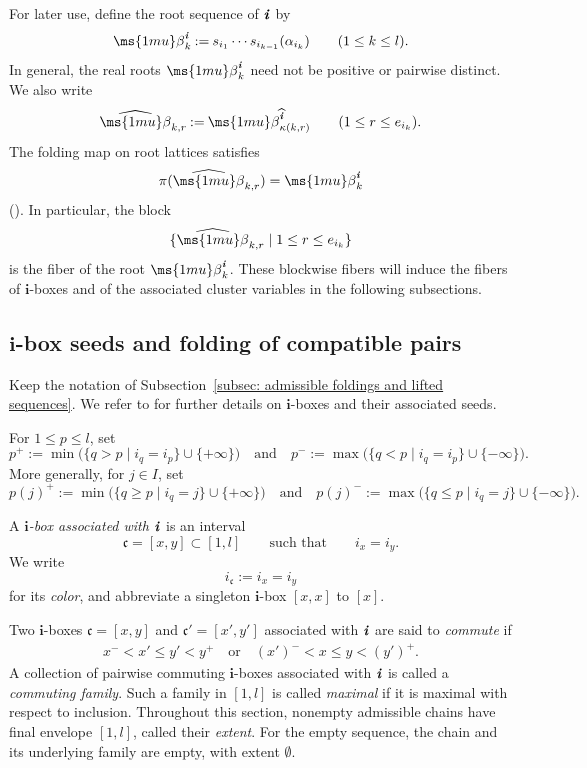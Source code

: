 \documentclass[12pt, leqno]{amsart}
\numberwithin{equation}{section}
\theoremstyle{plain}
\theoremstyle{definition}
\newcommand{\seteq}{\mathbin{:=}}
\newcommand{\be}{{\ms{1mu}\beta}}
\newcommand{\ii}{ \textbf{\textit{i}}}
\newcommand{\hbe}{\widehat{\be}}
\newcommand{\hii}{{\widehat{\ii}}}
\newcommand{\frakc}{\mathfrak{c}}
\newcommand{\bfi}{\mathbf{i}}
\newcommand{\qtq}[1][{and}]{\quad\text{{#1}}\quad}
\newcommand{\qtoq}[1][{or}]{\quad\text{{#1}}\quad}
\begin{document}
For later use, define the root sequence of \(\ii\) by
\begin{equation}\label{eq: root sequence}
\be_k^\ii \seteq s_{i_1}\cdots s_{i_{k-1}}(\alpha_{i_k}) \qquad(1\leq k\leq l).
\end{equation}
In general, the real roots \(\be_k^\ii\) need not be positive or
pairwise distinct. We also write
\[
\hbe_{k,r} \seteq \be_{\kappa(k,r)}^\hii  \qquad (1\leq r\leq e_{i_k}).
\]
The folding map on root lattices satisfies
\[
\pi(\hbe_{k,r})=\be_k^\ii
\]
(\cite[Lemma~2.4]{JO26}).
In particular, the block
\[
\{\hbe_{k,r}\mid1\leq r\leq e_{i_k}\}
\]
is the fiber of the root \(\be_k^\ii\).  These blockwise fibers will
induce the fibers of \(\bfi\)-boxes and of the associated cluster
variables in the following subsections.

\subsection{\texorpdfstring{\(\bfi\)}{i}-box seeds and folding of
compatible pairs}
\label{subsec: folding of box seeds}

Keep the notation of
Subsection~\ref{subsec: admissible foldings and lifted sequences}.
We refer to \cite{KKOP23F,KK24} for further details on
\(\bfi\)-boxes and their associated seeds.

For \(1\leq p\leq l\), set
\[
p^+ \seteq \min\bigl(\{q>p\mid i_q=i_p\}\cup\{+\infty\}\bigr)
\qtq
p^- \seteq \max\bigl(\{q<p\mid i_q=i_p\}\cup\{-\infty\}\bigr).
\]
More generally, for \(j\in I\), set
\[
p(j)^+ \seteq \min\bigl(\{q\geq p\mid i_q=j\}\cup\{+\infty\}\bigr)
\qtq
p(j)^- \seteq \max\bigl(\{q\leq p\mid i_q=j\}\cup\{-\infty\}\bigr).
\]

A \emph{\(\bfi\)-box associated with \(\ii\)} is an interval
\[
\frakc=[x,y]\subset[1,l] \qquad\text{such that}\qquad i_x=i_y.
\]
We write
\[
i_\frakc\seteq i_x=i_y
\]
for its \emph{color}, and abbreviate a singleton \(\bfi\)-box
\([x,x]\) to \([x]\).

Two \(\bfi\)-boxes $\frakc=[x,y]$ and $\frakc'=[x',y']$
associated with \(\ii\) are said to \emph{commute} if
\begin{align} \label{eq: commuting boxes}
x^-<x'\leq y'<y^+ \qtoq (x')^-<x\leq y<(y')^+.
\end{align}
A collection of pairwise commuting \(\bfi\)-boxes associated with
\(\ii\) is called a \emph{commuting family}.  Such a family in
\([1,l]\) is called \emph{maximal} if it is maximal with respect to
inclusion.   Throughout this section, nonempty admissible chains have final
envelope \([1,l]\), called their \emph{extent}.
For the empty sequence, the chain and its underlying family are empty,
with extent \(\emptyset\). 
\end{document}

